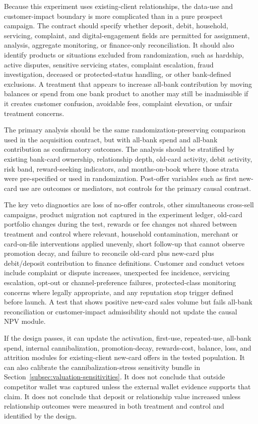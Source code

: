 \documentclass[11pt]{article}
\newcommand{\1}{\mathbf{1}}
\begin{document}
Because this experiment uses existing-client relationships, the data-use and
customer-impact boundary is more complicated than in a pure prospect campaign.
The contract should specify whether deposit, debit, household, servicing,
complaint, and digital-engagement fields are permitted for assignment,
analysis, aggregate monitoring, or finance-only reconciliation. It should also
identify products or situations excluded from randomization, such as hardship,
active disputes, sensitive servicing states, complaint escalation, fraud
investigation, deceased or protected-status handling, or other bank-defined
exclusions. A treatment that appears to increase all-bank contribution by
moving balances or spend from one bank product to another may still be
inadmissible if it creates customer confusion, avoidable fees, complaint
elevation, or unfair treatment concerns.

The primary analysis should be the same randomization-preserving comparison
used in the acquisition contract, but with all-bank spend and all-bank
contribution as confirmatory outcomes. The analysis should be stratified by
existing bank-card ownership, relationship depth, old-card activity, debit
activity, risk band, reward-seeking indicators, and months-on-book where those
strata were pre-specified or used in randomization. Post-offer variables such
as first new-card use are outcomes or mediators, not controls for the primary
causal contrast.

The key veto diagnostics are loss of no-offer controls, other simultaneous
cross-sell campaigns, product migration not captured in the experiment ledger,
old-card portfolio changes during the test, rewards or fee changes not shared
between treatment and control where relevant, household contamination,
merchant or card-on-file interventions applied unevenly, short follow-up that
cannot observe promotion decay, and failure to reconcile old-card plus
new-card plus debit/deposit contribution to finance definitions. Customer and
conduct vetoes include complaint or dispute increases, unexpected fee
incidence, servicing escalation, opt-out or channel-preference failures,
protected-class monitoring concerns where legally appropriate, and any
reputation stop trigger defined before launch. A test that shows positive
new-card sales volume but fails all-bank reconciliation or customer-impact
admissibility should not update the causal NPV module.

If the design passes, it can update the activation, first-use, repeated-use,
all-bank spend, internal cannibalization, promotion-decay, rewards-cost,
balance, loss, and attrition modules for existing-client new-card offers in
the tested population. It can also calibrate the cannibalization-stress
sensitivity bundle in Section~\ref{subsec:valuation-sensitivities}. It does
not conclude that outside competitor wallet was captured unless the external
wallet evidence supports that claim. It does not conclude that deposit or
relationship value increased unless relationship outcomes were measured in
both treatment and control and identified by the design.
\end{document}
